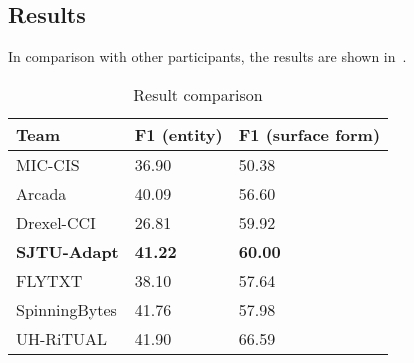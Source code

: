 \subsection{Results} 
In comparison with other participants, the results are shown in~.

\begin{table}[th]
	\small
	\centering
	\caption{Result comparison}
	\label{tbl:compare}
	\begin{tabular}{|l|l|l|}
		\hline
		Team                & F1 (entity)    & F1 (surface form) \\ \hline
		MIC-CIS             & 36.90          & 50.38             \\ \hline
		Arcada              & 40.09          & 56.60             \\ \hline
		Drexel-CCI          & 26.81          & 59.92             \\ \hline
		\textbf{SJTU-Adapt} & \textbf{41.22} & \textbf{60.00}    \\ \hline
		FLYTXT              & 38.10          & 57.64             \\ \hline
		SpinningBytes       & 41.76          & 57.98             \\ \hline
		UH-RiTUAL           & 41.90          & 66.59             \\ \hline
	\end{tabular}
\end{table}

